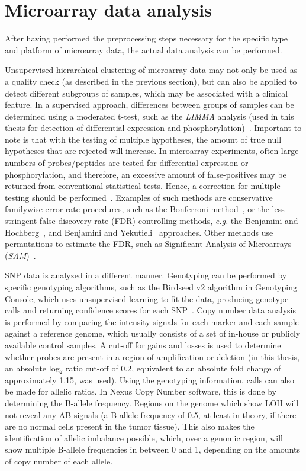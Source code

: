 %
\section{Microarray data analysis}\label{analysis1}
After having performed the preprocessing steps necessary for the specific type and platform of microarray data, the actual data analysis can be performed.

Unsupervised hierarchical clustering of microarray data may not only be used as a quality check (as described in the previous section), but can also be applied to detect different subgroups of samples, which may be associated with a clinical feature. In a supervised approach, differences between groups of samples can be determined using a moderated t-test, such as the {\it LIMMA} analysis (used in this thesis for detection of differential expression and phosphorylation)~\cite{smyth2004linear}. Important to note is that with the testing of multiple hypotheses, the amount of true null hypotheses that are rejected will increase. In microarray experiments, often large numbers of probes/peptides are tested for differential expression or phosphorylation, and therefore, an excessive amount of false\hyp{}positives may be returned from conventional statistical tests. Hence, a correction for multiple testing should be performed~\cite{allison2006microarray}. Examples of such methods are conservative familywise error rate procedures, such as the Bonferroni method~\cite{weisstein2006bonferroni}, or the less stringent false discovery rate (FDR) controlling methods, {\it e.g.} the Benjamini and Hochberg~\cite{benjamini1995controlling}, and Benjamini and Yekutieli~\cite{benjamini2001control} approaches. Other methods use permutations to estimate the FDR, such as Significant Analysis of Microarrays ({\it SAM})~\cite{tusher2001significance}.

SNP data is analyzed in a different manner. Genotyping can be performed by specific genotyping algorithms, such as the Birdseed v2 algorithm in Genotyping Console, which uses unsupervised learning to fit the data, producing genotype calls and returning confidence scores for each SNP~\cite{genotypingconsole}. Copy number data analysis is performed by comparing the intensity signals for each marker and each sample against a reference genome, which usually consists of a set of in-house or publicly available control samples. A cut-off for gains and losses is used to determine whether probes are present in a region of amplification or deletion (in this thesis, an absolute log$_2$ ratio cut-off of 0.2, equivalent to an absolute fold change of approximately 1.15, was used). Using the genotyping information, calls can also be made for allelic ratios. In Nexus Copy Number software, this is done by determining the B-allele frequency. Regions on the genome which show LOH will not reveal any AB signals (a B-allele frequency of 0.5, at least in theory, if there are no normal cells present in the tumor tissue). This also makes the identification of allelic imbalance possible, which, over a genomic region, will show multiple B-allele frequencies in between 0 and 1, depending on the amounts of copy number of each allele.


